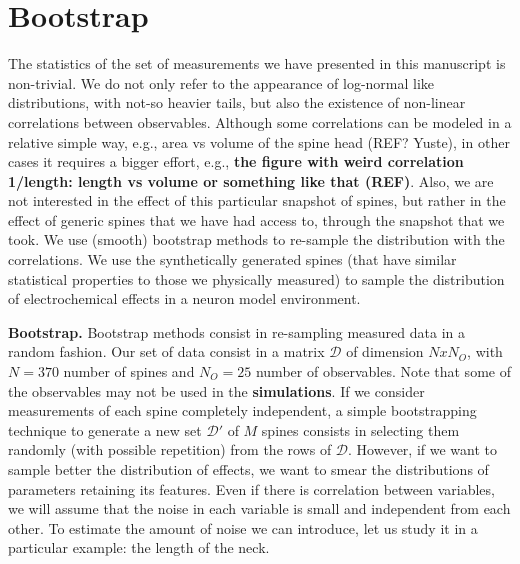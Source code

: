 \documentclass[10pt,letterpaper]{article}
\begin{document}
\section{Bootstrap}
The statistics of the set of measurements we have presented in this manuscript is non-trivial. We do not only refer to the appearance of log-normal like distributions, with not-so heavier tails, but also the existence of non-linear correlations between observables. Although some correlations can be modeled in a relative simple way, e.g., area vs volume of the spine head (REF? Yuste), in other cases it requires a bigger effort, e.g., {\bf the figure with weird correlation 1/length: length vs volume or something like that (REF)}. Also, we are not interested in the effect of this particular snapshot of spines, but rather in the effect of generic spines that we have had access to, through the snapshot that we took. We use (smooth) bootstrap methods to re-sample the distribution with the correlations. We use the synthetically generated spines (that have similar statistical properties to those we physically measured) to sample the distribution of electrochemical effects in a neuron model environment.

{\bf Bootstrap.} Bootstrap methods consist in re-sampling measured data in a random fashion. Our set of data consist in a matrix $\mathcal{D}$ of dimension $NxN_O$, with $N=370$ number of spines and $N_O = 25$ number of observables. Note that some of the observables may not be used in the {\bf simulations}. If we consider measurements of each spine completely independent, a simple bootstrapping technique to generate a new set $\mathcal{D}'$ of $M$ spines consists in selecting them randomly (with possible repetition) from the rows of $\mathcal{D}$. However, if we want to sample better the distribution of effects, we want to smear the distributions of parameters retaining its features. Even if there is correlation between variables, we will assume that the noise in each variable is small and independent from each other. To estimate the amount of noise we can introduce, let us study it in a particular example: the length of the neck. 
\end{document}
